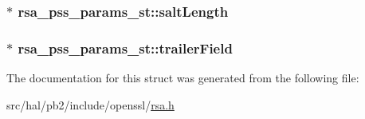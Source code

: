 \subsubsection[{\texorpdfstring{salt\+Length}{saltLength}}]{$\ast$ rsa\+\_\+pss\+\_\+params\+\_\+st\+::salt\+Length}\hypertarget{structrsa__pss__params__st_aa3831adeab05f41488cc226fff064091}{}\label{structrsa__pss__params__st_aa3831adeab05f41488cc226fff064091}
\subsubsection[{\texorpdfstring{trailer\+Field}{trailerField}}]{$\ast$ rsa\+\_\+pss\+\_\+params\+\_\+st\+::trailer\+Field}\hypertarget{structrsa__pss__params__st_a67aede448229164c1c5e359c3020ae53}{}\label{structrsa__pss__params__st_a67aede448229164c1c5e359c3020ae53}


The documentation for this struct was generated from the following file\+:\begin{DoxyCompactItemize}
\item 
src/hal/pb2/include/openssl/\hyperlink{rsa_8h}{rsa.\+h}\end{DoxyCompactItemize}

